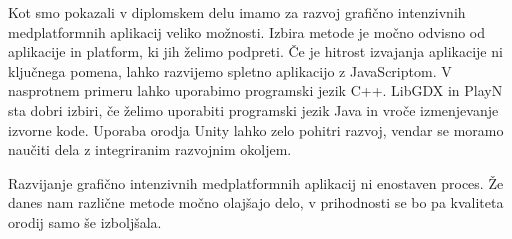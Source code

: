 Kot smo pokazali v diplomskem delu imamo za razvoj grafično intenzivnih medplatformnih aplikacij veliko možnosti. Izbira metode je močno odvisno od aplikacije in platform, ki jih želimo podpreti. Če je hitrost izvajanja aplikacije ni ključnega pomena, lahko razvijemo spletno aplikacijo z JavaScriptom. V nasprotnem primeru lahko uporabimo programski jezik C++. LibGDX in PlayN sta dobri izbiri, če želimo uporabiti programski jezik Java in vroče izmenjevanje izvorne kode. Uporaba orodja Unity lahko zelo pohitri razvoj, vendar se moramo naučiti dela z integriranim razvojnim okoljem.

Razvijanje grafično intenzivnih medplatformnih aplikacij ni enostaven proces. Že danes nam različne metode močno olajšajo delo, v prihodnosti se bo pa kvaliteta orodij samo še izboljšala.